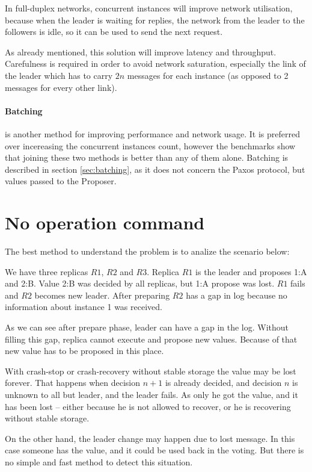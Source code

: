 In full-duplex networks, concurrent instances will improve network utilisation, because when the leader is waiting for replies, the network from the leader to the followers is idle, so it can be used to send the next request. 

As already mentioned, this solution will improve latency and throughput. Carefulness is required in order to avoid network saturation, especially the link of the leader which has to carry $2n$ messages for each instance (as opposed to 2 messages for every other link).

\paragraph{Batching} is another method for improving performance and network usage. It is preferred over incereasing the concurrent instances count, however the benchmarks show that joining these two methods is better than any of them alone. Batching is described in section \ref{sec:batching}, as it does not concern the Paxos protocol, but values passed to the Proposer.

\section{No operation command}

The best method to understand the problem is to analize the scenario below:

We have three replicas $R1$, $R2$ and $R3$. Replica $R1$ is the leader and proposes {1:A} and {2:B}. Value {2:B} was decided by all replicas, but {1:A} propose was lost. $R1$ fails and $R2$ becomes new leader. After preparing $R2$ has a gap in log because no information about instance 1 was received. 

As we can see after prepare phase, leader can have a gap in the log. Without filling this gap, replica cannot execute and propose new values. Because of that new value has to be proposed in this place.

With crash-stop or crash-recovery without stable storage the value may be lost forever. That happens when decision $n+1$ is already decided, and decision $n$ is unknown to all but leader, and the leader fails. As only he got the value, and it has been lost -- either because he is not allowed to recover, or he is recovering without stable storage.

On the other hand, the leader change may happen due to lost \alive message. In this case someone has the value, and it could be used back in the voting. But there is no simple and fast method to detect this situation.

